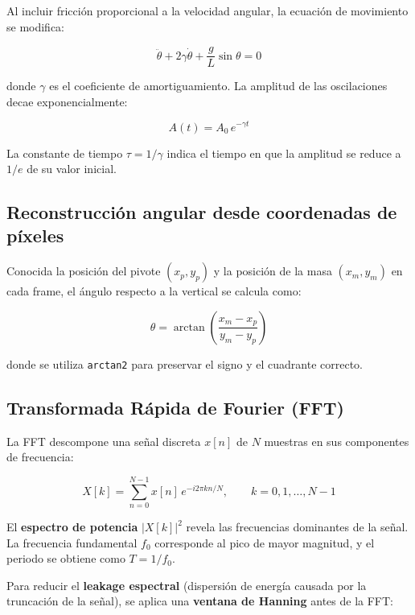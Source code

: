 \documentclass[12pt,a4paper]{article}
\begin{document}
Al incluir fricción proporcional a la velocidad angular, la ecuación de movimiento se modifica:

\begin{equation}
    \ddot{\theta} + 2\gamma\dot{\theta} + \frac{g}{L}\sin\theta = 0
\end{equation}

donde $\gamma$ es el coeficiente de amortiguamiento. La amplitud de las oscilaciones decae exponencialmente:

\begin{equation}
    \label{eq:damping}
    A(t) = A_0\, e^{-\gamma t}
\end{equation}

La constante de tiempo $\tau = 1/\gamma$ indica el tiempo en que la amplitud se reduce a $1/e$ de su valor inicial.

\subsection{Reconstrucción angular desde coordenadas de píxeles}

Conocida la posición del pivote $(x_p, y_p)$ y la posición de la masa $(x_m, y_m)$ en cada frame, el ángulo respecto a la vertical se calcula como:

\begin{equation}
    \label{eq:theta}
    \theta = \arctan\!\left(\frac{x_m - x_p}{y_m - y_p}\right)
\end{equation}

donde se utiliza \texttt{arctan2} para preservar el signo y el cuadrante correcto.

\subsection{Transformada Rápida de Fourier (FFT)}

La FFT descompone una señal discreta $x[n]$ de $N$ muestras en sus componentes de frecuencia:

\begin{equation}
    X[k] = \sum_{n=0}^{N-1} x[n]\, e^{-i 2\pi k n / N}, \qquad k = 0, 1, \ldots, N-1
\end{equation}

El \textbf{espectro de potencia} $|X[k]|^2$ revela las frecuencias dominantes de la señal. La frecuencia fundamental $f_0$ corresponde al pico de mayor magnitud, y el periodo se obtiene como $T = 1/f_0$.

Para reducir el \textbf{leakage espectral} (dispersión de energía causada por la truncación de la señal), se aplica una \textbf{ventana de Hanning} antes de la FFT:
\end{document}
